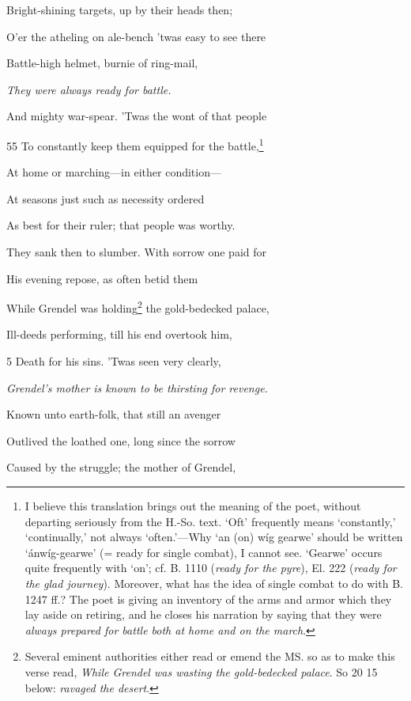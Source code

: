 Bright-shining targets, up by their heads then;

O’er the atheling on ale-bench ’twas easy to see there

Battle-high helmet, burnie of ring-mail,

\emph{They were always
ready for battle.}

And mighty war-spear. ’Twas the wont of that people

55
To constantly keep them equipped for the battle,\footnote{I believe this translation brings out the meaning of the poet, without
departing seriously from the H.-So. text. ‘Oft’ frequently means ‘constantly,’
‘continually,’ not always ‘often.’—Why ‘an (on) wíg gearwe’ should be
written ‘ánwíg-gearwe’ (= ready for single combat), I cannot see. ‘Gearwe’
occurs quite frequently with ‘on’; cf. B. 1110 (\emph{ready for the pyre}), El. 222
(\emph{ready for the glad journey}). Moreover, what has the idea of single combat
to do with B. 1247 ff.? The poet is giving an inventory of the arms and
armor which they lay aside on retiring, and he closes his narration by saying
that they were \emph{always prepared for battle both at home and on the march}.}

At home or marching—in either condition—

At seasons just such as necessity ordered

As best for their ruler; that people was worthy.



They sank then to slumber. With sorrow one paid for

His evening repose, as often betid them

While Grendel was holding\footnote{Several eminent authorities either read or emend the MS. so as to make
this verse read, \emph{While Grendel was wasting the gold-bedecked palace}. So 20 15
below: \emph{ravaged the desert}.} the gold-bedecked palace,

Ill-deeds performing, till his end overtook him,

5
Death for his sins. ’Twas seen very clearly,

\emph{Grendel’s mother
is known to be
thirsting for revenge.}

Known unto earth-folk, that still an avenger

Outlived the loathed one, long since the sorrow

Caused by the struggle; the mother of Grendel,

